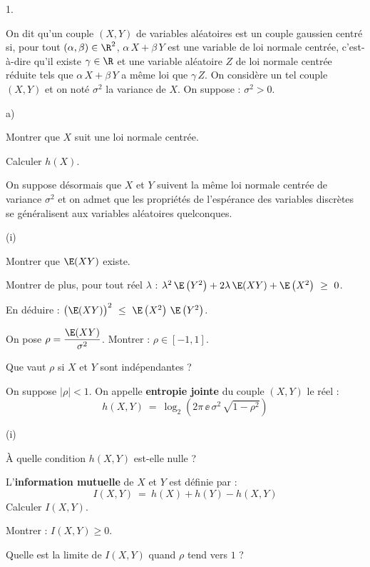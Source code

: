 \documentclass[11pt]{article}%
\begin{document}
\begin{noliste}{1.}
\item On dit qu'un couple $(X,Y)$ de variables aléatoires est un
  couple gaussien centré si, pour tout $(\alpha, \beta) \in \R^2$,
  $\alpha \, X + \beta \, Y$ est une variable de loi normale centrée,
  c'est-à-dire qu'il existe $\gamma \in \R$ et une variable aléatoire
  $Z$ de loi normale centrée réduite tels que $\alpha \, X + \beta \,
  Y$ a même loi que $\gamma \, Z$. On considère un tel couple $(X,Y)$
  et on noté $\sigma^2$ la variance de $X$. On suppose : $\sigma^2
  >0$.
  \begin{noliste}{a)}
    \setlength{\itemsep}{2mm}
  \item Montrer que $X$ suit une loi normale centrée.
    
  \item Calculer $h(X)$.
    
  \item On suppose désormais que $X$ et $Y$ suivent la même loi
    normale centrée de variance $\sigma^2$ et on admet que les
    propriétés de l'espérance des variables discrètes se généralisent
    aux variables aléatoires quelconques.
    \begin{nonoliste}{(i)}
      \setlength{\itemsep}{2mm}
    \item Montrer que $\E(XY)$ existe.
      
    \item Montrer de plus, pour tout réel $\lambda$ : $\lambda^2 \,
      \E\left( Y^2 \right) + 2 \lambda \, \E(XY) + \E\left( X^2
      \right) \ \geq \ 0$.
      
    \item En déduire : $\big( \E(XY) \big)^2 \ \leq \ \E\left( X^2
      \right) \, \E\left( Y^2 \right)$.
      
    \item On pose $\rho = \dfrac{\E(XY)}{\sigma^2}$. Montrer : $\rho
      \in [-1,1]$.
      
    \item Que vaut $\rho$ si $X$ et $Y$ sont indépendantes ?
    \end{nonoliste}
    
  \item On suppose $|\rho| <1$. On appelle {\bf entropie jointe} du
    couple $(X,Y)$ le réel :
    \[
      h(X,Y) \ = \ \log_2\left(2 \pi \, \ee \, \sigma^2 \, \sqrt{1-
          \rho^2} \right)
    \]
    \begin{nonoliste}{(i)}
      \setlength{\itemsep}{2mm}
    \item À quelle condition $h(X,Y)$ est-elle nulle ?
      
    \item L'{\bf information mutuelle} de $X$ et $Y$ est définie par :
      \[
        I(X,Y) \ = \ h(X) + h(Y) - h(X,Y)
      \]
      Calculer $I(X,Y)$.
      
    \item Montrer : $I(X,Y) \geq 0$.
      
    \item Quelle est la limite de $I(X,Y)$ quand $\rho$ tend vers $1$ ?
    \end{nonoliste}
  \end{noliste}
\end{noliste}
\end{document}
